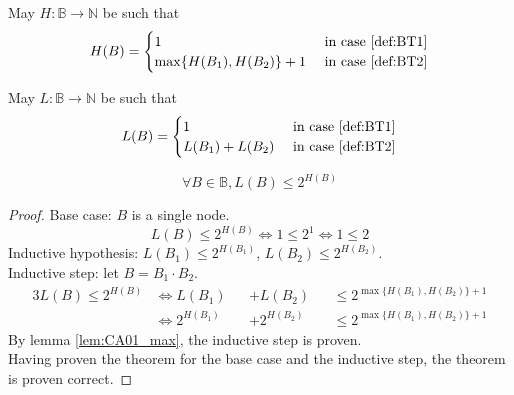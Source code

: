 \begin{definition}
	May $H \colon \mathbb{B} \rightarrow \mathbb{N}$ be such that
	\begin{alignat*}{2}
		H(B)=
		\begin{cases}
			1                    & \text{ in case \ref{def:BT1}} \\
			\max \{H(B_1),H(B_2) \} +1 & \text{ in case \ref{def:BT2}}
		\end{cases}
	\end{alignat*}
\end{definition}

\begin{definition}
	May $L \colon \mathbb{B} \rightarrow \mathbb{N}$ be such that
	\begin{alignat*}{2}
		L(B)=
		\begin{cases}
			1             & \text{ in case \ref{def:BT1}} \\
			L(B_1)+L(B_2) & \text{ in case \ref{def:BT2}}
		\end{cases}
	\end{alignat*}
\end{definition}

\begin{theorem}
\begin{equation*}
	\forall B \in \mathbb{B}, L(B) \leq 2^{H(B)}
\end{equation*}
\end{theorem}

\begin{proof}
Base case: $B$ is a single node.
\begin{equation*}
	L(B) \leq 2^{H(B)}
	\iff 1 \leq 2^1
	\iff 1 \leq 2
\end{equation*}
Inductive hypothesis: $L(B_1) \leq 2^{H(B_1)}$, $L(B_2) \leq 2^{H(B_2)}$.\\
Inductive step: let $B=B_1 \cdot B_2$.
\begin{alignat*}{3}
	L(B) \leq 2^{H(B)}
	&\iff L(B_1)    &&+L(B_2)     && \leq 2^{\max \{ H(B_1),H(B_2) \} +1 }\\
	&\iff 2^{H(B_1)}&&+2^{H(B_2)} && \leq 2^{\max \{ H(B_1),H(B_2) \} +1 }
\end{alignat*}
By lemma \ref{lem:CA01_max}, the inductive step is proven.\\
Having proven the theorem for the base case and the inductive step, the theorem is proven correct.
\end{proof}

